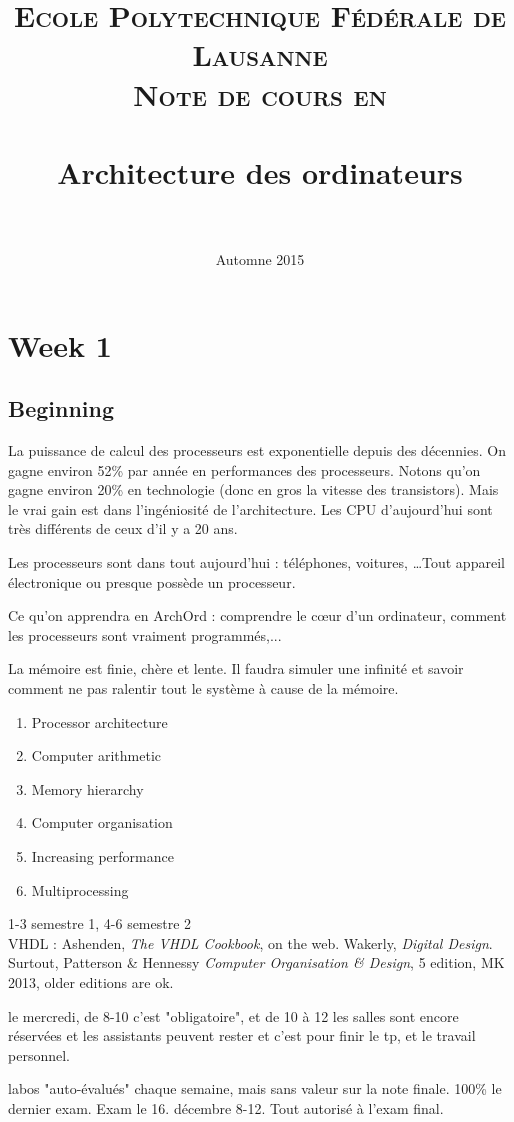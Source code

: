 \documentclass[12pt,a4paper]{article}
\date{Automne 2015}
\title{	
\normalfont \normalsize 
\textsc{Ecole Polytechnique Fédérale de Lausanne} \\ [25pt] %
\textsc{Note de cours en }\\ [0pt] %
\horrule{0.5pt} \\[0.4cm] %
\huge Architecture des ordinateurs\\ %
\horrule{2pt} \\[0.5cm] %
}
\begin{document}
\maketitle
\newpage
\tableofcontents
{}
\renewcommand{\(}{\left(}
\renewcommand{\)}{\right)}
\section{Week 1}
\subsection*{Beginning}
La puissance de calcul des processeurs est exponentielle depuis des décennies. On gagne environ 52\% par année en performances des processeurs. Notons qu'on gagne environ 20\% en technologie (donc en gros la vitesse des transistors). Mais le vrai gain est dans l'ingéniosité de l'architecture. Les CPU d'aujourd'hui sont très différents de ceux d'il y a 20 ans.

Les processeurs sont dans tout aujourd'hui : téléphones, voitures, \ldots Tout appareil électronique ou presque possède un processeur.

Ce qu'on apprendra en ArchOrd : comprendre le c\oe ur d'un ordinateur, comment les processeurs sont vraiment programmés,...

La mémoire est finie, chère et lente. Il faudra simuler une infinité et savoir comment ne pas ralentir tout le système à cause de la mémoire.

\begin{enumerate}
	\item Processor architecture
	\item Computer arithmetic
	\item Memory hierarchy
	\item Computer organisation
	\item Increasing performance
	\item Multiprocessing
\end{enumerate}
1-3 semestre 1, 4-6 semestre 2\\
 VHDL : Ashenden, \textit{The VHDL Cookbook}, on the web. Wakerly, \textit{Digital Design}. Surtout, Patterson \& Hennessy \textit{Computer Organisation \& Design}, 5 edition, MK 2013, older editions are ok.

 le mercredi, de 8-10 c'est "obligatoire", et de 10 à 12 les salles sont encore réservées et les assistants peuvent rester et c'est pour finir le tp, et le travail personnel.

 labos "auto-évalués" chaque semaine, mais sans valeur sur la note finale. 100\% le dernier exam. Exam le 16.  décembre 8-12. Tout autorisé à l'exam final.
\end{document}
